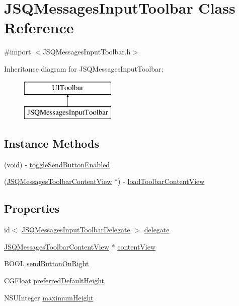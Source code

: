 \hypertarget{interface_j_s_q_messages_input_toolbar}{}\section{J\+S\+Q\+Messages\+Input\+Toolbar Class Reference}
\label{interface_j_s_q_messages_input_toolbar}


{\ttfamily \#import $<$J\+S\+Q\+Messages\+Input\+Toolbar.\+h$>$}

Inheritance diagram for J\+S\+Q\+Messages\+Input\+Toolbar\+:\begin{figure}[H]
\begin{center}
\leavevmode
\includegraphics[height=2.000000cm]{interface_j_s_q_messages_input_toolbar}
\end{center}
\end{figure}
\subsection*{Instance Methods}
\begin{DoxyCompactItemize}
\item 
(void) -\/ \hyperlink{interface_j_s_q_messages_input_toolbar_ac89b6a44ebefc09cdde437de6b457217}{toggle\+Send\+Button\+Enabled}
\item 
(\hyperlink{interface_j_s_q_messages_toolbar_content_view}{J\+S\+Q\+Messages\+Toolbar\+Content\+View} $\ast$) -\/ \hyperlink{interface_j_s_q_messages_input_toolbar_aee4b42dd93ee7f2aea157a1a2c061d4b}{load\+Toolbar\+Content\+View}
\end{DoxyCompactItemize}
\subsection*{Properties}
\begin{DoxyCompactItemize}
\item 
id$<$ \hyperlink{protocol_j_s_q_messages_input_toolbar_delegate-p}{J\+S\+Q\+Messages\+Input\+Toolbar\+Delegate} $>$ \hyperlink{interface_j_s_q_messages_input_toolbar_af65de93b536460ed4bb0a7588f241afd}{delegate}
\item 
\hyperlink{interface_j_s_q_messages_toolbar_content_view}{J\+S\+Q\+Messages\+Toolbar\+Content\+View} $\ast$ \hyperlink{interface_j_s_q_messages_input_toolbar_adc00b5da906c53dc8075cc2a832ba6b4}{content\+View}
\item 
B\+O\+O\+L \hyperlink{interface_j_s_q_messages_input_toolbar_aba8383e330cbdf4187991ee810709751}{send\+Button\+On\+Right}
\item 
C\+G\+Float \hyperlink{interface_j_s_q_messages_input_toolbar_aab6cdb4bf7fc9221c06adb7b18b7c239}{preferred\+Default\+Height}
\item 
N\+S\+U\+Integer \hyperlink{interface_j_s_q_messages_input_toolbar_ae48c9a471d580726838ce52a8bb52f5d}{maximum\+Height}
\end{DoxyCompactItemize}


